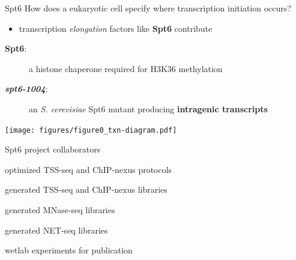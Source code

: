 \documentclass[aspectratio=169]{beamer}
\begin{document}
\begin{frame}{Spt6}
    How does a eukaryotic cell specify where transcription initiation occurs?
    \begin{itemize}
        \item transcription \textit{elongation} factors like \textbf{Spt6} contribute
    \end{itemize}

    \begin{description}
        \item [\textbf{Spt6}:] a histone chaperone required for H3K36 methylation
        \item [\textbf{\textit{spt6-1004}}:] an \textit{S. cerevisiae} Spt6 mutant producing \textbf{intragenic transcripts}
    \end{description}
    \vspace{1em}

    \centering
    \texttt{[image: figures/figure0\_txn-diagram.pdf]}
\end{frame}

\begin{frame}{Spt6 project collaborators}
    \begin{description}
        \item [Steve Doris] optimized TSS-seq and ChIP-nexus protocols
        \item [] generated TSS-seq and ChIP-nexus libraries
        \item [Olga Viktorovskaya] generated MNase-seq libraries
        \item [Magdalena Murawska] generated NET-seq libraries
        \item [Dan Spatt] wetlab experiments for publication
    \end{description}
\end{frame}



\begin{frame}
\end{frame}
\end{document}
